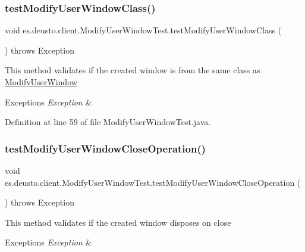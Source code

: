\subsubsection{\texorpdfstring{test\+Modify\+User\+Window\+Class()}{testModifyUserWindowClass()}}
{\footnotesize\ttfamily void es.\+deusto.\+client.\+Modify\+User\+Window\+Test.\+test\+Modify\+User\+Window\+Class (\begin{DoxyParamCaption}{ }\end{DoxyParamCaption}) throws Exception}

This method validates if the created window is from the same class as \hyperlink{classes_1_1deusto_1_1client_1_1_modify_user_window}{Modify\+User\+Window}


\begin{DoxyExceptions}{Exceptions}
{\em Exception} & \\
\hline
\end{DoxyExceptions}


Definition at line 59 of file Modify\+User\+Window\+Test.\+java.

\mbox{\label{classes_1_1deusto_1_1client_1_1_modify_user_window_test_ae1c496d5a25114e058f9a4b3d6ee3448}} 
\subsubsection{\texorpdfstring{test\+Modify\+User\+Window\+Close\+Operation()}{testModifyUserWindowCloseOperation()}}
{\footnotesize\ttfamily void es.\+deusto.\+client.\+Modify\+User\+Window\+Test.\+test\+Modify\+User\+Window\+Close\+Operation (\begin{DoxyParamCaption}{ }\end{DoxyParamCaption}) throws Exception}

This method validates if the created window disposes on close


\begin{DoxyExceptions}{Exceptions}
{\em Exception} & \\
\hline
\end{DoxyExceptions}


